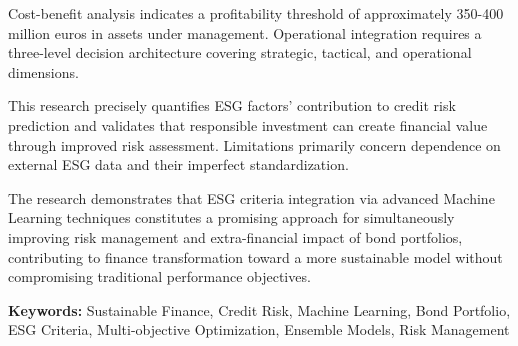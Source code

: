 Cost-benefit analysis indicates a profitability threshold of approximately 350-400 million euros in assets under management. Operational integration requires a three-level decision architecture covering strategic, tactical, and operational dimensions.

This research precisely quantifies ESG factors' contribution to credit risk prediction and validates that responsible investment can create financial value through improved risk assessment. Limitations primarily concern dependence on external ESG data and their imperfect standardization.

The research demonstrates that ESG criteria integration via advanced Machine Learning techniques constitutes a promising approach for simultaneously improving risk management and extra-financial impact of bond portfolios, contributing to finance transformation toward a more sustainable model without compromising traditional performance objectives.

\textbf{Keywords:} Sustainable Finance, Credit Risk, Machine Learning, Bond Portfolio, ESG Criteria, Multi-objective Optimization, Ensemble Models, Risk Management